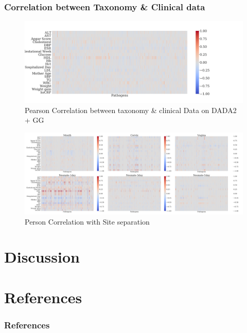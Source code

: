 \documentclass{beamer}
\begin{document}
    \begin{frame}[allowframebreaks]
        \frametitle{Correlation between Taxonomy \& Clinical data}

        \begin{figure}
            \includegraphics[width=\linewidth]{figures/Step41/everything/DADA2/gg/everything.DADA2.gg.pearson.pdf}
            \caption{Pearson Correlation between taxonomy \& clinical Data on DADA2 + GG}
        \end{figure}

        \begin{figure}
            \includegraphics[width=\linewidth]{figures/Step41-1/everything.DADA2.gg.pearson.Sites.pdf}
            \caption{Person Correlation with Site separation}
        \end{figure}
    \end{frame}

    \section{Discussion}

    \section{References}
   	\begin{frame}[allowframebreaks]
        \frametitle{References}
        
        
    \end{frame}
\end{document}
